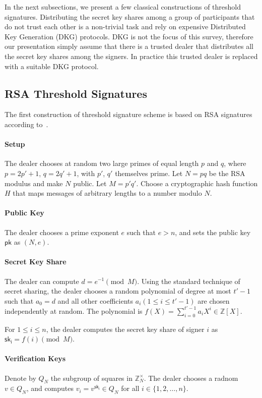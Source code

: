 \par In the next subsections, we present a few classical constructions of threshold signatures. Distributing the secret key shares among a group of participants that do not trust each other is a non-trivial task and rely on expensive Distributed Key Generation (DKG) protocols. DKG is not the focus of this survey, therefore our presentation simply assume that there is a trusted dealer that distributes all the secret key shares among the signers. In practice this trusted dealer is replaced with a suitable DKG protocol. 

\subsection{RSA Threshold Signatures}
The first construction of threshold signature scheme is based on RSA signatures according to~\cite{DBLP:conf/eurocrypt/Shoup00}. 

\paragraph{Setup} The dealer chooses at random two large primes of equal length $p$ and $q$, where $p=2p' + 1$, $q=2q'+1$, with $p'$, $q'$ themselves prime. Let $N=pq$ be the RSA modulus and make $N$ public. Let $M=p'q'$. Choose a cryptographic hash function $H$ that maps messages of arbitrary lengths to a number modulo $N$. 

\paragraph{Public Key} The dealer chooses a prime exponent $e$ such that $e>n$, and sets the public key $\mathsf{pk}$ as $(N, e)$. 

\paragraph{Secret Key Share} The dealer can compute $d=e^{-1}\pmod{M}$. Using the standard technique of secret sharing, the dealer chooses a random polynomial of degree at most $t'-1$ such that $a_0=d$ and all other coefficients $a_i (1\le i \le t'-1)$ are chosen independently at random. The polynomial is $f(X) = \sum_{i=0}^{t'-1}a_i X^i \in \mathbb{Z}[X]$. 

\par For $1\le i \le n$, the dealer computes the secret key share of signer $i$ as $\mathsf{sk_i} = f(i)\pmod M$. 

\paragraph{Verification Keys} Denote by $Q_N$ the subgroup of squares in $\mathbb{Z}_N^\times$. The dealer chooses a radnom $v\in Q_N$, and computes $v_i=v^{\mathsf{sk_i}}\in Q_N$ for all $i\in \{1, 2, \dots, n\}$. 


